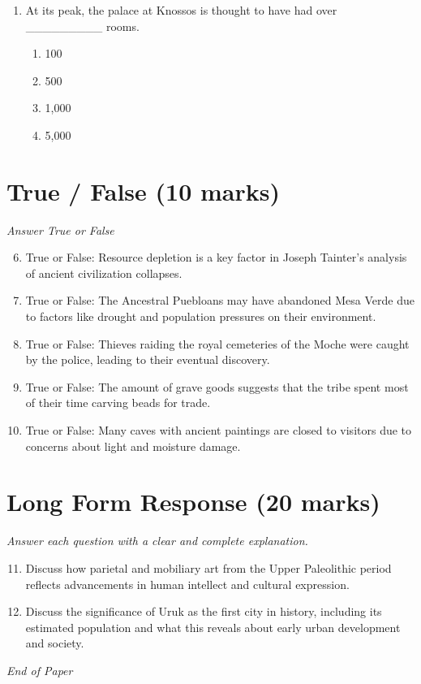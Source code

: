 \documentclass[12pt]{article}
\begin{document}
\begin{enumerate}[label=\arabic*.]
\begin{enumerate}[label=(\alph*)]
    \item communal feasts and the torture of captives to be sacrificed.
\end{enumerate}
\item At its peak, the palace at Knossos is thought to have had over \_\_\_\_\_\_\_\_\_ rooms.
\begin{enumerate}[label=(\alph*)]
    \item 100
    \item 500
    \item 1,000
    \item 5,000
\end{enumerate}
\end{enumerate}

\section*{True / False (10 marks)}
\textit{Answer True or False}
\begin{enumerate}[label=\arabic*.]
\setcounter{enumi}{5}
\item True or False: Resource depletion is a key factor in Joseph Tainter's analysis of ancient civilization collapses.
\item True or False: The Ancestral Puebloans may have abandoned Mesa Verde due to factors like drought and population pressures on their environment.
\item True or False: Thieves raiding the royal cemeteries of the Moche were caught by the police, leading to their eventual discovery.
\item True or False: The amount of grave goods suggests that the tribe spent most of their time carving beads for trade.
\item True or False: Many caves with ancient paintings are closed to visitors due to concerns about light and moisture damage.
\end{enumerate}

\section*{Long Form Response (20 marks)}
\textit{Answer each question with a clear and complete explanation.}
\begin{enumerate}[label=\arabic*.]
\setcounter{enumi}{10}
\item Discuss how parietal and mobiliary art from the Upper Paleolithic period reflects advancements in human intellect and cultural expression.
\item Discuss the significance of Uruk as the first city in history, including its estimated population and what this reveals about early urban development and society.
\end{enumerate}

\vfill
\noindent\textit{End of Paper}
\end{document}

